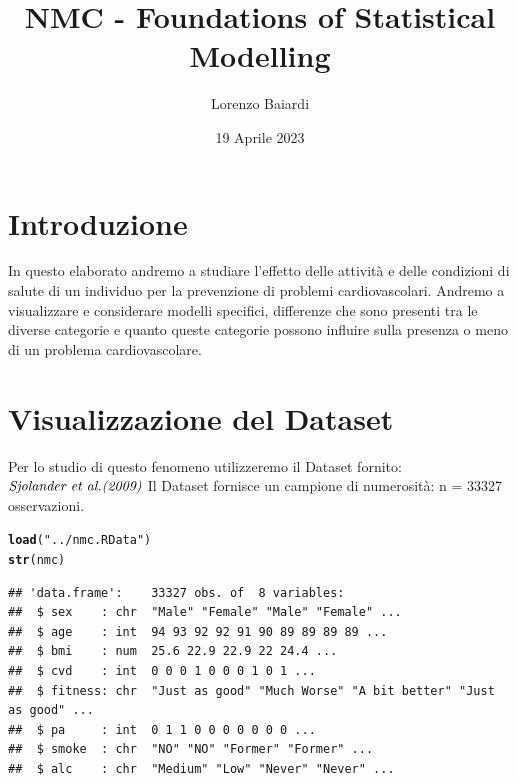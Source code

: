 \documentclass{article}\usepackage[]{graphicx}\usepackage[]{xcolor}
\title{NMC - Foundations of Statistical Modelling}
\author{Lorenzo Baiardi}
\date{19 Aprile 2023}
\makeatletter
\newcommand{\hlstr}[1]{\textcolor[rgb]{0.192,0.494,0.8}{#1}}%
\newcommand{\hlstd}[1]{\textcolor[rgb]{0.345,0.345,0.345}{#1}}%
\newcommand{\hlkwd}[1]{\textcolor[rgb]{0.737,0.353,0.396}{\textbf{#1}}}%
\newenvironment{kframe}{%
 \def\at@end@of@kframe{}%
 \ifinner\ifhmode%
  \def\at@end@of@kframe{\end{minipage}}%
  \begin{minipage}{\columnwidth}%
 \fi\fi%
 \def\FrameCommand##1{\hskip\@totalleftmargin \hskip-\fboxsep
 \colorbox{shadecolor}{##1}\hskip-\fboxsep
     \hskip-\linewidth \hskip-\@totalleftmargin \hskip\columnwidth}%
 \MakeFramed {\advance\hsize-\width
   \@totalleftmargin\z@ \linewidth\hsize
   \@setminipage}}%
 {\par\unskip\endMakeFramed%
 \at@end@of@kframe}
\newenvironment{knitrout}{}{} %
\makeatother
\begin{document}
\maketitle

\clearpage

\tableofcontents

\clearpage


\section{Introduzione}
  In questo elaborato andremo a studiare l'effetto delle attività e delle
  condizioni di salute di un individuo per la prevenzione di problemi 
  cardiovascolari. Andremo a visualizzare e considerare modelli specifici,
  differenze che sono presenti tra le diverse categorie e quanto queste categorie
  possono influire sulla presenza o meno di un problema cardiovascolare.


\section{Visualizzazione del Dataset} 
  Per lo studio di questo fenomeno utilizzeremo il Dataset fornito: 
  $\emph{Sjolander et al.(2009)}$
  Il Dataset fornisce un campione di numerosità: n = 33327 osservazioni. 
  
\begin{knitrout}
\color{fgcolor}\begin{kframe}
\begin{alltt}
\hlkwd{load}\hlstd{(}\hlstr{"../nmc.RData"}\hlstd{)}
\hlkwd{str}\hlstd{(nmc)}
\end{alltt}
\begin{verbatim}
## 'data.frame':	33327 obs. of  8 variables:
##  $ sex    : chr  "Male" "Female" "Male" "Female" ...
##  $ age    : int  94 93 92 92 91 90 89 89 89 89 ...
##  $ bmi    : num  25.6 22.9 22.9 22 24.4 ...
##  $ cvd    : int  0 0 0 1 0 0 0 1 0 1 ...
##  $ fitness: chr  "Just as good" "Much Worse" "A bit better" "Just as good" ...
##  $ pa     : int  0 1 1 0 0 0 0 0 0 0 ...
##  $ smoke  : chr  "NO" "NO" "Former" "Former" ...
##  $ alc    : chr  "Medium" "Low" "Never" "Never" ...
\end{verbatim}
\end{kframe}
\end{knitrout}
 
\end{document}
